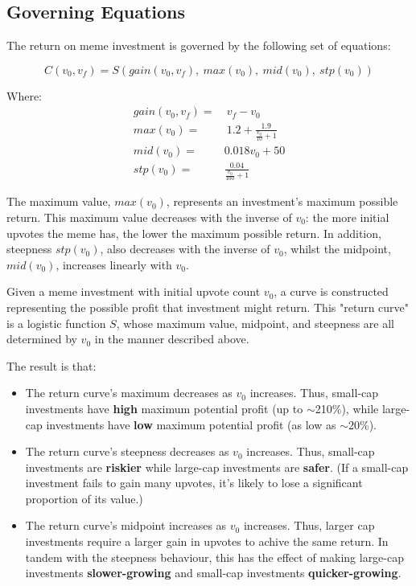 \documentclass[a4paper, 12pt]{article}
\begin{document}
\subsection*{Governing Equations}
\label{sec:org59ef09a}

The return on meme investment is governed by the following set of equations:

\begin{equation*}
C(v_0, v_f) = S(gain(v_0, v_f),\ max(v_0),\ mid(v_0),\ stp(v_0))
\end{equation*}

Where:
\begin{align*}
gain(v_0, v_f) =& \ v_f - v_0\\
max(v_0) =& \ 1.2 + \frac{1.9}{\frac{v_0}{10}+1}\\
mid(v_0) =& 0.018v_0 + 50 \\
stp(v_0) =& \frac{0.04}{\frac{v_0}{100} + 1}  
\end{align*}

The maximum value, \(max(v_0)\), represents an investment's maximum possible return. This maximum 
value decreases with the inverse of \(v_0\): the more initial upvotes the meme has, the lower 
the maximum possible return. In addition, steepness \(stp(v_0)\), also decreases with the inverse of \(v_0\), 
whilst the midpoint, \(mid(v_0)\), increases linearly with \(v_0\). 

Given a meme investment with initial upvote count \(v_0\), a curve is constructed representing
the possible profit that investment might return. This "return curve" is a logistic function
\(S\), whose maximum value, midpoint, and steepness are all determined by \(v_0\) in
the manner described above. 

The result is that:

\begin{itemize}
\item The return curve's maximum decreases as \(v_0\) increases. Thus, small-cap
investments have \textbf{high} maximum potential profit (up to \(\sim\)210\%), while large-cap
investments have \textbf{low} maximum potential profit (as low as \(\sim\)20\%).

\item The return curve's steepness decreases as \(v_0\) increases. Thus, small-cap
investments are \textbf{riskier} while large-cap investments are \textbf{safer}. (If a
small-cap investment fails to gain many upvotes, it's likely to lose a significant
proportion of its value.)

\item The return curve's midpoint increases as \(v_0\) increases. Thus, larger cap
investments require a larger gain in upvotes to achive the same return. In
tandem with the steepness behaviour, this has the effect of making large-cap
investments \textbf{slower-growing} and small-cap investments \textbf{quicker-growing}.
\end{itemize}
\end{document}
